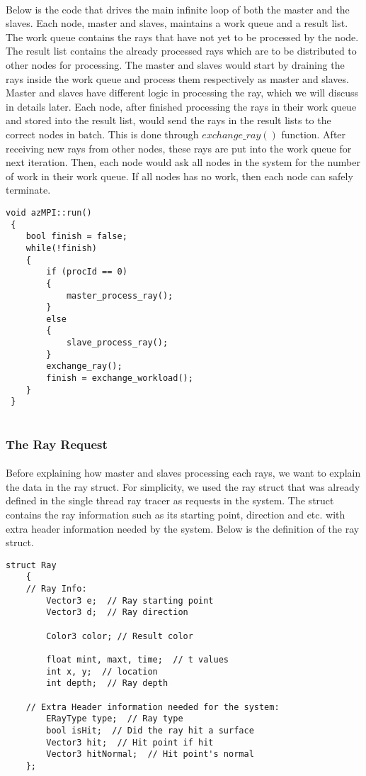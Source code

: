 \documentclass[a4paper, oneside, 10pt]{article}
\begin{document}
\paragraph{} Below is the code that drives the main infinite loop of both the master and the slaves. Each node, master and slaves, maintains a work queue and a result list. The work queue contains the rays that have not yet to be processed by the node. The result list contains the already processed rays which are to be distributed to other nodes for processing. The master and slaves would start by draining the rays inside the work queue and process them respectively as master and slaves. Master and slaves have different logic in processing the ray, which we will discuss in details later.  Each node, after finished processing the rays in their work queue and stored into the result list, would send the rays in the result lists to the correct nodes in batch. This is done through $exchange\_ray()$ function. After receiving new rays from other nodes, these rays are put into the work queue for next iteration. Then, each node would ask all nodes in the system for the number of work in their work queue. If all nodes has no work, then each node can safely terminate.
 \lstset{language=C++} 
 \begin{lstlisting}[frame=single] 
void azMPI::run()
 {
    bool finish = false;
    while(!finish)
    {
        if (procId == 0)
        {
            master_process_ray();
        }
        else
        {
            slave_process_ray();
        }
        exchange_ray();
        finish = exchange_workload();
    }
 }
 
\end{lstlisting}

\subsubsection{The Ray Request}
\paragraph{} Before explaining how master and slaves processing each rays, we want to explain the data in the ray struct.  For simplicity, we used the ray struct that was already defined in the single thread ray tracer as requests in the system.  The struct contains the ray information such as its starting point, direction and etc. with extra header information needed by the system.  Below is the definition of the ray struct.
\lstset{language=C++} 
\begin{lstlisting}[frame=single] 
struct Ray
    {
    // Ray Info:
        Vector3 e;  // Ray starting point
        Vector3 d;  // Ray direction
 
        Color3 color; // Result color
        
        float mint, maxt, time;  // t values
        int x, y;  // location
        int depth;  // Ray depth
        
    // Extra Header information needed for the system:
        ERayType type;  // Ray type
        bool isHit;  // Did the ray hit a surface
        Vector3 hit;  // Hit point if hit
        Vector3 hitNormal;  // Hit point's normal
    }; 
\end{lstlisting}
\end{document}
